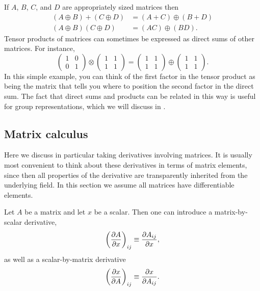 If $A$, $B$, $C$, and $D$ are appropriately sized matrices then
\begin{equation}\begin{aligned}
(A\oplus B)+(C\oplus D)&=(A+C)\oplus(B+D)\\
(A\oplus B)(C\oplus D)&=(AC)\oplus(BD).
\end{aligned}\end{equation}
Tensor products of matrices can sometimes be expressed
as direct sums of other matrices. For instance,
\begin{equation}
\left(\begin{array}{cc}
1 & 0 \\
0 & 1
\end{array}\right) \otimes\left(\begin{array}{cc}
1 & 1 \\
1 & 1
\end{array}\right) =\left(\begin{array}{cc}
1 & 1 \\
1 & 1
\end{array}\right) \oplus\left(\begin{array}{cc}
1 & 1 \\
1 & 1
\end{array}\right).
\end{equation}
In this simple example, you can think of the first factor
in the tensor product as being the matrix that tells you where to position the
second factor in the direct sum. The fact that direct sums and products can be
related in this way is useful for group representations, which we will
discuss in .

\subsection{Matrix calculus}\label{sec:matrixCalculus} 

Here we discuss in particular taking derivatives involving matrices.
It is usually most convenient to think about these derivatives in terms of
matrix elements, since then all properties of the derivative are transparently
inherited from the underlying field. In this section we assume all matrices have
differentiable elements.

Let $A$ be a matrix and let $x$ be a scalar. Then one can
introduce a matrix-by-scalar derivative,
\begin{equation}
\left(\pdv{A}{x}\right)_{ij}\equiv\pdv{A_{ij}}{x},
\end{equation}
as well as a scalar-by-matrix derivative
\begin{equation}
\left(\pdv{x}{A}\right)_{ij}\equiv\pdv{x}{A_{ij}}.
\end{equation}


